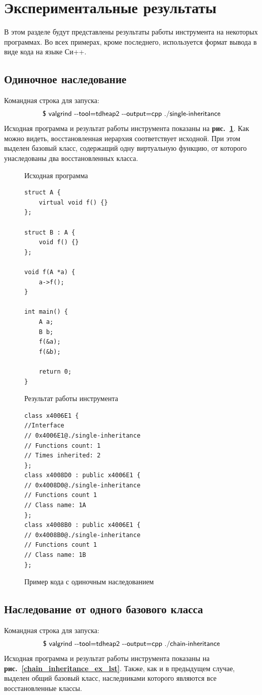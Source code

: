 \documentclass[a4paper,12pt,russian]{article}
\newcommand{\picref}[1]{\textbf{рис.~\ref{#1}}}
\newcommand{\code}[1]{\textsf{#1}}
\begin{document}
\newpage
\section{Экспериментальные результаты}
В этом разделе будут представлены результаты работы инструмента на некоторых программах. Во всех примерах, кроме последнего, используется формат вывода в виде кода на языке Си++.

\subsection{Одиночное наследование}
Командная строка для запуска:
\[\mbox{\code{\$ valgrind -{}-tool=tdheap2 -{}-output=cpp ./single-inheritance}}\]
Исходная программа и результат работы инструмента показаны на \picref{single_inheritance_ex_lst}.
Как можно видеть, восстановленная иерархия соответствует исходной.
При этом выделен базовый класс, содержащий одну виртуальную функцию, от которого унаследованы два восстановленных класса.

\begin{figure}[h!]
\begin{minipage}[t]{0.45\linewidth}
\caption*{Исходная программа}
\begin{lstlisting}
struct A {
    virtual void f() {}
};

struct B : A {
    void f() {}
};

void f(A *a) {
    a->f();
}

int main() {
    A a;
    B b;
    f(&a);
    f(&b);

    return 0;
}
\end{lstlisting}
\end{minipage}
\begin{minipage}[t]{0.5\linewidth}
\caption*{Результат работы инструмента}
\begin{lstlisting}
class x4006E1 {
//Interface
// 0x4006E1@./single-inheritance
// Functions count: 1
// Times inherited: 2
};
class x4008D0 : public x4006E1 {
// 0x4008D0@./single-inheritance
// Functions count 1
// Class name: 1A
};
class x4008B0 : public x4006E1 {
// 0x4008B0@./single-inheritance
// Functions count 1
// Class name: 1B
};
\end{lstlisting}
\end{minipage}
\caption{Пример кода с одиночным наследованием}
\label{single_inheritance_ex_lst}
\end{figure}

\subsection{Наследование от одного базового класса}
Командная строка для запуска:
\[\mbox{\code{\$ valgrind -{}-tool=tdheap2 -{}-output=cpp ./chain-inheritance}}\]
Исходная программа и результат работы инструмента показаны на \picref{chain_inheritance_ex_lst}.
Также, как и в предыдущем случае, выделен общий базовый класс, наследниками которого являются все восстановленные классы.
\end{document}
